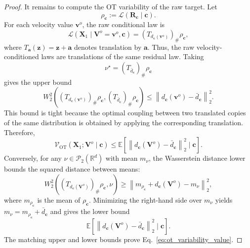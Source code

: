 \documentclass[10pt,twocolumn,letterpaper]{article}
\begin{document}
\begin{proof}
It remains to compute the OT variability of the raw target. Let
\[
    \rho_{\mathbf c}
    :=
    \mathcal L(\mathbf R_{\mathbf c}\mid\mathbf c).
\]
For each velocity value $\mathbf v^{o}$, the raw conditional law is
\[
    \mathcal L
    (
        \mathbf X_1
        \mid
        \mathbf V^{o}=\mathbf v^{o},
        \mathbf c
    )
    =
    (T_{d_{\mathbf c}(\mathbf v^{o})})_{\#}\rho_{\mathbf c},
\]
where $T_{\mathbf a}(\mathbf z)=\mathbf z+\mathbf a$ denotes translation by
$\mathbf a$. Thus, the raw velocity-conditioned laws are translations of the
same residual law. Taking
\[
    \nu^\star
    =
    (T_{\bar d_{\mathbf c}})_{\#}\rho_{\mathbf c}
\]
gives the upper bound
\[
    W_2^2
    \left(
        (T_{d_{\mathbf c}(\mathbf v^{o})})_{\#}\rho_{\mathbf c},
        (T_{\bar d_{\mathbf c}})_{\#}\rho_{\mathbf c}
    \right)
    \le
    \left\|
        d_{\mathbf c}(\mathbf v^{o})
        -
        \bar d_{\mathbf c}
    \right\|_2^2.
\]
This bound is tight because the optimal coupling between two translated copies
of the same distribution is obtained by applying the corresponding translation.
Therefore,
\[
    \mathcal V_{\mathrm{OT}}
    (
        \mathbf X_1;
        \mathbf V^{o}
        \mid
        \mathbf c
    )
    \le
    \mathbb E
    \left[
        \left\|
            d_{\mathbf c}(\mathbf V^{o})
            -
            \bar d_{\mathbf c}
        \right\|_2^2
        \mid
        \mathbf c
    \right].
\]
Conversely, for any $\nu\in\mathcal P_2(\mathbb R^d)$ with mean
$m_{\nu}$, the Wasserstein distance lower bounds the squared distance between
means:
\[
    W_2^2
    \left(
        (T_{d_{\mathbf c}(\mathbf V^{o})})_{\#}\rho_{\mathbf c},
        \nu
    \right)
    \ge
    \left\|
        m_{\rho_{\mathbf c}}
        +
        d_{\mathbf c}(\mathbf V^{o})
        -
        m_{\nu}
    \right\|_2^2,
\]
where $m_{\rho_{\mathbf c}}$ is the mean of $\rho_{\mathbf c}$. Minimizing the
right-hand side over $m_{\nu}$ yields
$m_{\nu}=m_{\rho_{\mathbf c}}+\bar d_{\mathbf c}$ and gives the lower bound
\[
    \mathbb E
    \left[
        \left\|
            d_{\mathbf c}(\mathbf V^{o})
            -
            \bar d_{\mathbf c}
        \right\|_2^2
        \mid
        \mathbf c
    \right].
\]
The matching upper and lower bounds prove
Eq.~\eqref{eq:ot_variability_value}.


\end{proof}
\end{document}
